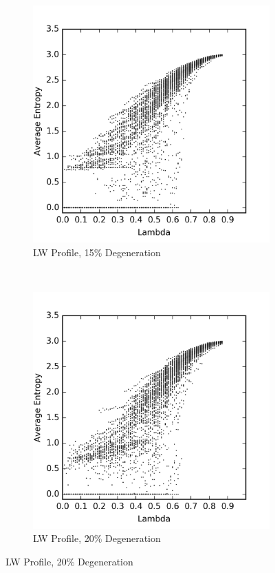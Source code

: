 \documentclass[a4paper,11pt]{article}
\begin{document}
\begin{figure}[htp]
\begin{subfigure}[t]{0.4\textwidth}
  \centering
  \includegraphics[width=\textwidth]{ch6_figs/degen_stoma_15}
  \caption{LW Profile, 15\% Degeneration}
  \label{fig:lw_degen_pt_15}
  \end{subfigure}
~
\begin{subfigure}[t]{0.4\textwidth}
  \centering
  \includegraphics[width=\textwidth]{ch6_figs/degen_stoma_20}
  \caption{LW Profile, 20\% Degeneration}
  \label{fig:lw_degen_pt_20}
  \end{subfigure}


\end{figure}
\end{document}
